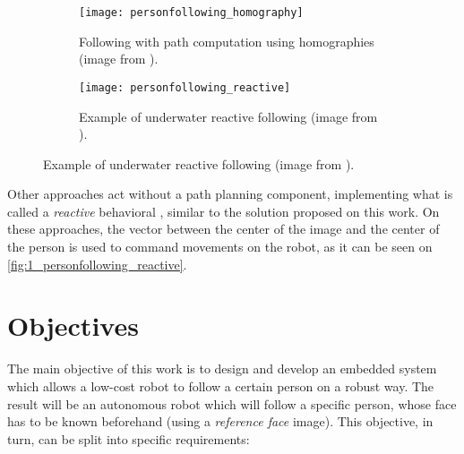 \begin{figure}
	\centering
	\begin{subfigure}[t]{0.45\linewidth}
		\centering
		\texttt{[image: personfollowing\_homography]}
		\caption{Following with path computation using homographies (image from \cite{personfollowing_summary}).}
		\label{fig:1_personfollowing_homography}
	\end{subfigure}
	\begin{subfigure}[t]{0.45\linewidth}
		\centering
		
		\texttt{[image: personfollowing\_reactive]}
		\caption{Example of underwater reactive following (image from \cite{personfollowing_reactive}).}
		\label{fig:1_personfollowing_reactive}
	\end{subfigure}
\end{figure}



Other approaches act without a path planning component, implementing what is called a \textit{reactive} behavioral \cite{personfollowing_reactive}, similar to the solution proposed on this work. On these approaches, the vector between the center of the image and the center of the person is used to command movements on the robot, as it can be seen on \autoref{fig:1_personfollowing_reactive}.


\section{Objectives}
\label{sec:1_objectives}

	The main objective of this work is to design and develop an embedded system which allows a low-cost robot to follow a certain person on a robust way. The result will be an autonomous robot which will follow a specific person, whose face has to be known beforehand (using a \textit{reference face} image). This objective, in turn, can be split into specific requirements:
	

